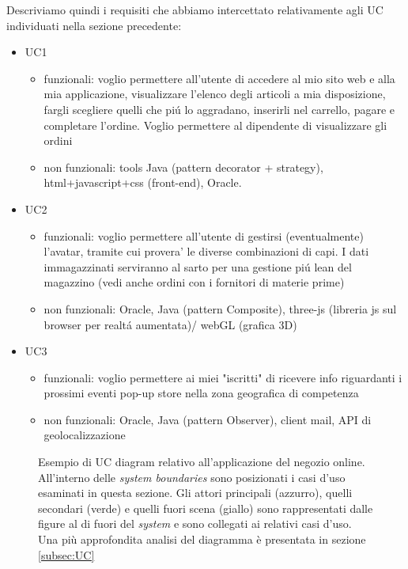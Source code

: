 \documentclass[12pt]{article}
\begin{document}
Descriviamo quindi i requisiti che abbiamo intercettato relativamente agli UC individuati nella sezione precedente: 
\begin{itemize}
	\item UC1
		\begin{itemize}
		\item funzionali: voglio permettere all'utente di accedere al mio sito web e alla mia applicazione, visualizzare l'elenco degli articoli a mia disposizione, fargli scegliere quelli che pi\'u lo aggradano, inserirli nel carrello, pagare e completare l'ordine. Voglio permettere al dipendente di visualizzare gli ordini 
		\item non funzionali: tools Java (pattern decorator + strategy), html+javascript+css (front-end), Oracle. 
		\end{itemize}
	\item UC2
		\begin{itemize}
		\item funzionali: voglio permettere all'utente di gestirsi (eventualmente) l'avatar, tramite cui provera' le diverse combinazioni di capi. I dati immagazzinati serviranno al sarto per una gestione pi\'u lean del magazzino (vedi anche ordini con i fornitori di materie prime)
		\item non funzionali: Oracle, Java (pattern Composite), three-js (libreria js sul browser per realt\'a aumentata)/ webGL (grafica 3D)
		\end{itemize}
	\item UC3
		\begin{itemize}
		\item funzionali: voglio permettere ai miei "iscritti" di ricevere info riguardanti i prossimi eventi pop-up store nella zona geografica di competenza 
		\item non funzionali: Oracle, Java (pattern Observer), client mail, API di geolocalizzazione
		\end{itemize}
\end{itemize}


\vspace{1em}
\begin{figure}[ht]
  \centering
   \makebox[\textwidth][c]{}
  \caption{\small Esempio di UC diagram relativo all'applicazione del negozio online. All'interno delle {\em system boundaries} sono posizionati i casi d'uso esaminati in questa sezione. Gli attori principali (azzurro), quelli secondari (verde) e quelli fuori scena (giallo) sono rappresentati dalle figure al di fuori del {\em system} e sono collegati ai relativi casi d'uso. Una più approfondita analisi del diagramma è presentata in sezione \ref{subsec:UC}}
  \label{fig:UC_diagram}
\end{figure}
\end{document}
